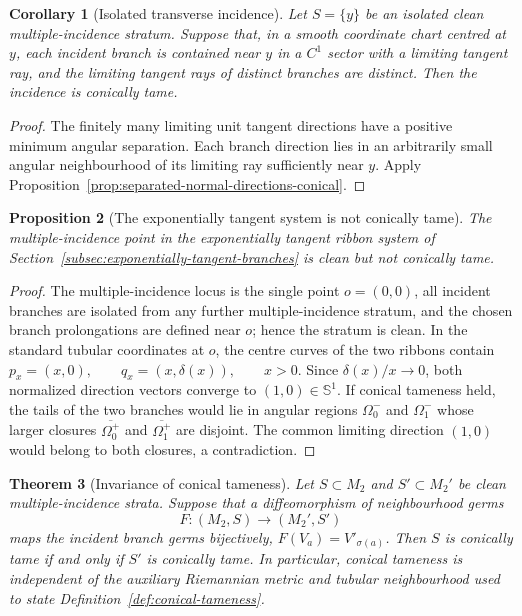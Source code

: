 \documentclass[11pt]{article}
\theoremstyle{plain}
\newtheorem{theorem}{Theorem}[section]
\newtheorem{proposition}[theorem]{Proposition}
\newtheorem{corollary}[theorem]{Corollary}
\theoremstyle{definition}
\begin{document}
\begin{corollary}[Isolated transverse incidence]
\label{cor:isolated-transverse-conical}
Let \(S=\{y\}\) be an isolated clean multiple-incidence stratum. Suppose
that, in a smooth coordinate chart centred at \(y\), each incident branch is
contained near \(y\) in a \(C^1\) sector with a limiting tangent ray, and the
limiting tangent rays of distinct branches are distinct. Then the incidence is
conically tame.
\end{corollary}

\begin{proof}
The finitely many limiting unit tangent directions have a positive minimum
angular separation. Each branch direction lies in an arbitrarily small
angular neighbourhood of its limiting ray sufficiently near \(y\). Apply
Proposition~\ref{prop:separated-normal-directions-conical}.
\end{proof}

\begin{proposition}[The exponentially tangent system is not conically tame]
\label{prop:exponential-not-conically-tame}
The multiple-incidence point in the exponentially tangent ribbon system of
Section~\ref{subsec:exponentially-tangent-branches} is clean but not
conically tame.
\end{proposition}

\begin{proof}
The multiple-incidence locus is the single point \(o=(0,0)\), all incident
branches are isolated from any further multiple-incidence stratum, and the
chosen branch prolongations are defined near \(o\); hence the stratum is
clean. In the standard tubular coordinates at \(o\), the centre curves of
the two ribbons contain
\(p_x=(x,0), \qquad q_x=(x,\delta(x)), \qquad x>0\).
Since \(\delta(x)/x\to0\), both normalized direction vectors converge to
\((1,0)\in\mathbb S^1\). If conical tameness held, the tails of the two
branches would lie in angular regions \(\Omega_0^-\) and \(\Omega_1^-\)
whose larger closures \(\overline{\Omega_0^+}\) and
\(\overline{\Omega_1^+}\) are disjoint. The common limiting direction
\((1,0)\) would belong to both closures, a contradiction.
\end{proof}

\begin{theorem}[Invariance of conical tameness]
\label{thm:conical-tameness-invariance}
Let \(S\subset M_2\) and \(S'\subset M_2'\) be clean multiple-incidence
strata. Suppose that a diffeomorphism of neighbourhood germs
\[
  F:(M_2,S)\longrightarrow(M_2',S')
\]
maps the incident branch germs bijectively,
\(F(V_a)=V'_{\sigma(a)}\). Then \(S\) is conically tame if and only if
\(S'\) is conically tame. In particular, conical tameness is independent of
the auxiliary Riemannian metric and tubular neighbourhood used to state
Definition~\ref{def:conical-tameness}.
\end{theorem}
\end{document}
